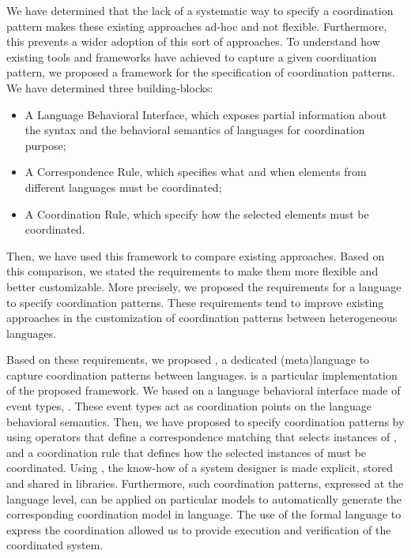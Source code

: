 We have determined that the lack of a systematic way to specify a coordination pattern makes these existing approaches ad-hoc and not flexible. Furthermore, this prevents a wider adoption of this sort of approaches. To understand how existing tools and frameworks have achieved to capture a given coordination pattern, we proposed a framework for the specification of coordination patterns. We have determined three building-blocks:

	\begin{itemize}
	\item A Language Behavioral Interface, which exposes partial information about the syntax and the behavioral semantics of languages for coordination purpose; 
	
	\item A Correspondence Rule, which specifies what and when elements from different languages must be coordinated;
	
	\item A Coordination Rule, which specify how the selected elements must be coordinated. 
\end{itemize}

Then, we have used this framework to compare existing approaches. Based on this comparison, we stated the requirements to make them more flexible and better customizable. More precisely, we proposed the requirements for a language to specify coordination patterns. These requirements tend to improve existing approaches in the customization of coordination patterns between heterogeneous languages.

Based on these requirements, we proposed \bcool, a dedicated (meta)language to capture coordination patterns between languages. \bcool is a particular implementation of the proposed framework. We based on a language behavioral interface made of event types, \ie \dse. These event types act as coordination points on the language behavioral semantics. Then, we have proposed to specify coordination patterns by using operators that define a correspondence matching that selects instances of \dse, and a coordination rule that defines how the selected instances of \dse must be coordinated. Using \bcool, the know-how of a system designer is made explicit, stored and shared in libraries. Furthermore, such coordination patterns, expressed at the language level, can be applied on particular models to automatically generate the corresponding coordination model in \ccsl language. The use of the formal \ccsl language to express the coordination allowed us to provide execution and verification of the coordinated system.
	
